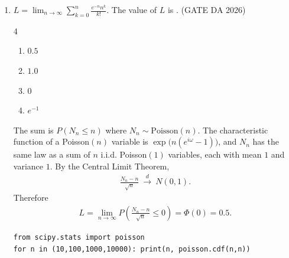\begin{enumerate}[label=\textbf{Q.\arabic*},leftmargin=*,start=1]
\item[\textbf{Q.45}] $\displaystyle L=\lim_{n\to\infty}\sum_{k=0}^{n}\frac{e^{-n}n^k}{k!}$.
The value of $L$ is \underline{\hspace{1.5cm}}.
\hfill (GATE DA 2026)
\begin{multicols}{4}
\begin{enumerate}[label=(\alph*),itemsep=0pt]
 \item $0.5$ \item $1.0$ \item $0$ \item $e^{-1}$
\end{enumerate}
\end{multicols}
\solution
The sum is $P(N_n\le n)$ where $N_n\sim\text{Poisson}(n)$. The characteristic function of
a Poisson$(n)$ variable is $\exp\!\big(n(e^{i\omega}-1)\big)$, and $N_n$ has the same law as
a sum of $n$ i.i.d. Poisson$(1)$ variables, each with mean $1$ and variance $1$.
By the Central Limit Theorem,
\begin{align}
\frac{N_n-n}{\sqrt n}\ \xrightarrow{d}\ N(0,1).
\end{align}
Therefore
\begin{align}
L=\lim_{n\to\infty}P\!\left(\frac{N_n-n}{\sqrt n}\le0\right)=\Phi(0)=\boxed{0.5}.
\end{align}
\begin{lstlisting}
from scipy.stats import poisson
for n in (10,100,1000,10000): print(n, poisson.cdf(n,n))
\end{lstlisting}


\end{enumerate}
